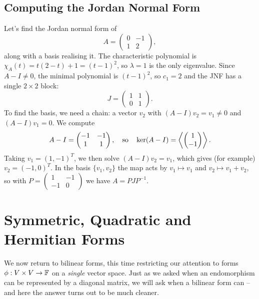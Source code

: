 \documentclass[a4paper]{scrartcl}
\begin{document}
\subsection{Computing the Jordan Normal Form}

\begin{example}
    Let's find the Jordan normal form of
    $$
    A = \begin{pmatrix}
        0 & -1 \\ 1 & 2
    \end{pmatrix},
    $$
    along with a basis realising it. The characteristic polynomial is $\chi_A(t) = t(2 - t) + 1 = (t-1)^2$, so $\lambda = 1$ is the only eigenvalue. Since $A - I \neq 0$, the minimal polynomial is $(t - 1)^2$, so $c_1 = 2$ and the JNF has a single $2 \times 2$ block:
    $$
    J = \begin{pmatrix}
        1 & 1 \\ 0 & 1
    \end{pmatrix}.
    $$
    To find the basis, we need a chain: a vector $v_2$ with $(A - I)v_2 = v_1 \neq 0$ and $(A - I)v_1 = 0$. We compute
    $$
    A - I = \begin{pmatrix}
        -1 & -1 \\ 1 & 1
    \end{pmatrix}, \quad \text{so} \quad \operatorname{ker}(A - I) = \left\langle \begin{pmatrix} 1 \\ -1 \end{pmatrix} \right\rangle.
    $$
    Taking $v_1 = (1, -1)^T$, we then solve $(A - I)v_2 = v_1$, which gives (for example) $v_2 = (-1, 0)^T$. In the basis $\{v_1, v_2\}$ the map acts by $v_1 \mapsto v_1$ and $v_2 \mapsto v_1 + v_2$, so with $P = \begin{pmatrix} 1 & -1 \\ -1 & 0 \end{pmatrix}$ we have $A = PJP^{-1}$.
\end{example}

\section{Symmetric, Quadratic and Hermitian Forms}

We now return to bilinear forms, this time restricting our attention to forms $\phi: V \times V \rightarrow \mathbb{F}$ on a \emph{single} vector space. Just as we asked when an endomorphism can be represented by a diagonal matrix, we will ask when a bilinear form can -- and here the answer turns out to be much cleaner.
\end{document}
